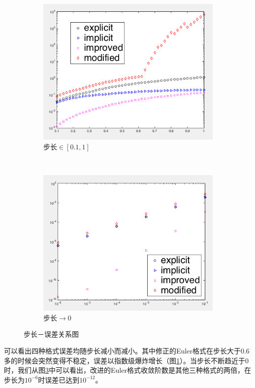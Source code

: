\documentclass{homework}
\begin{document}
\begin{figure}[H]
    \hspace{-4em}
    \begin{subfigure}[t]{0.6\textwidth}
        \centering
        \includegraphics[width=\textwidth]{step-err-1.png}
        \caption{步长$\in [0.1, 1]$}
        \label{fig:boost}
    \end{subfigure}~
    \begin{subfigure}[t]{0.6\textwidth}
        \centering
        \includegraphics[width=\textwidth]{step-err-2.png}
        \caption{步长$\to 0$}
        \label{fig:accuracy}
    \end{subfigure}
    \caption{步长－误差关系图}
\end{figure}
可以看出四种格式误差均随步长减小而减小。其中修正的Euler格式在步长大于0.6多的时候会突然变得不稳定，误差以指数级爆炸增长（图\ref{fig:boost}）。当步长不断趋近于0时，我们从图\ref{fig:accuracy}中可以看出，改进的Euler格式收敛阶数是其他三种格式的两倍，在步长为$10^{-6}$时误差已达到$10^{-12}$。
\end{document}
